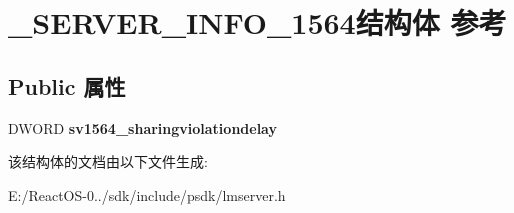 \hypertarget{struct___s_e_r_v_e_r___i_n_f_o__1564}{}\section{\+\_\+\+S\+E\+R\+V\+E\+R\+\_\+\+I\+N\+F\+O\+\_\+1564结构体 参考}
\label{struct___s_e_r_v_e_r___i_n_f_o__1564}
\subsection*{Public 属性}
\begin{DoxyCompactItemize}
\item 
\mbox{\label{struct___s_e_r_v_e_r___i_n_f_o__1564_a3340b3a040fba73635aa6db421693b13}} 
D\+W\+O\+RD {\bfseries sv1564\+\_\+sharingviolationdelay}
\end{DoxyCompactItemize}


该结构体的文档由以下文件生成\+:\begin{DoxyCompactItemize}
\item 
E\+:/\+React\+O\+S-\/0../sdk/include/psdk/lmserver.\+h\end{DoxyCompactItemize}
